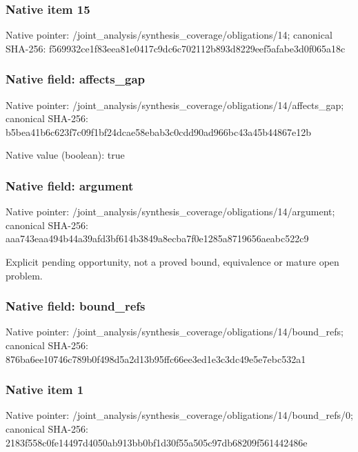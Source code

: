 \documentclass[10pt,a4paper]{article}
\begin{document}
\subsubsection{Native item 15}
Native pointer: /joint\_\allowbreak{}analysis/synthesis\_\allowbreak{}coverage/obligations/14; canonical SHA-256: f569932ce1f83eea81e0417c9dc6c702112b893d8229eef5afabe3d0f065a18c

\subsubsection{Native field: affects\_\allowbreak{}gap}
Native pointer: /joint\_\allowbreak{}analysis/synthesis\_\allowbreak{}coverage/obligations/14/affects\_\allowbreak{}gap; canonical SHA-256: b5bea41b6c623f7c09f1bf24dcae58ebab3c0cdd90ad966bc43a45b44867e12b

Native value (boolean): true

\subsubsection{Native field: argument}
Native pointer: /joint\_\allowbreak{}analysis/synthesis\_\allowbreak{}coverage/obligations/14/argument; canonical SHA-256: aaa743eaa494b44a39afd3bf614b3849a8ecba7f0e1285a8719656aeabc522c9

\begingroup\raggedright\sloppy Explicit pending opportunity,\allowbreak{} not a proved bound,\allowbreak{} equivalence or mature open problem.\par\endgroup

\subsubsection{Native field: bound\_\allowbreak{}refs}
Native pointer: /joint\_\allowbreak{}analysis/synthesis\_\allowbreak{}coverage/obligations/14/bound\_\allowbreak{}refs; canonical SHA-256: 876ba6ee10746c789b0f498d5a2d13b95ffc66ee3ed1e3c3dc49e5e7ebc532a1

\subsubsection{Native item 1}
Native pointer: /joint\_\allowbreak{}analysis/synthesis\_\allowbreak{}coverage/obligations/14/bound\_\allowbreak{}refs/0; canonical SHA-256: 2183f558c0fe14497d4050ab913bb0bf1d30f55a505c97db68209f561442486e
\end{document}
